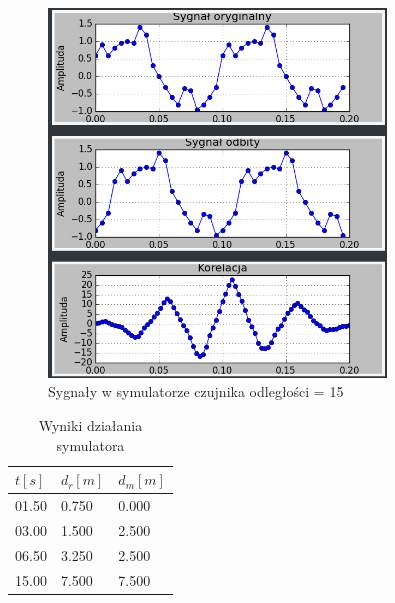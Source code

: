 \documentclass{article}
\begin{document}
{{\begin{figure}[h!]
            \end{figure}
            \begin{figure}[h!]
                \centering
                \includegraphics[width=0.8\textwidth]{img/sim8.png}
                \caption{Sygnały w symulatorze czujnika odległości = 15}
            \end{figure}
            \FloatBarrier
            \begin{table}[h!]
                \centering
                \begin{tabular}{|l|l|l|}
                    \hline
                    $t[s]$ & $d_r[m]$ & $d_m[m]$ \\ \hline
                    01.50  & 0.750    & 0.000    \\ \hline
                    03.00  & 1.500    & 2.500    \\ \hline
                    06.50  & 3.250    & 2.500    \\ \hline
                    15.00  & 7.500    & 7.500    \\ \hline
                \end{tabular}
                \caption{Wyniki działania symulatora}
            \end{table}
        }
        \newpage

}
\end{document}
